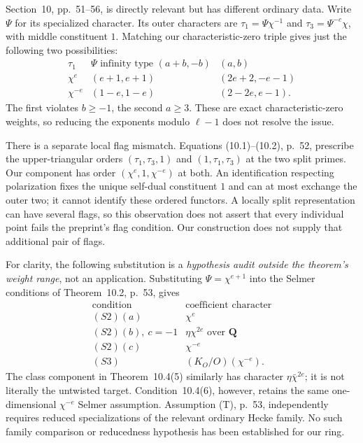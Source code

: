 Section~10, pp.~51--56, is directly relevant but has
different ordinary data.  Write $\Psi$ for its
specialized character.  Its outer characters are
$\tau_1=\Psi\chi^{-1}$ and
$\tau_3=\Psi^{-c}\chi$, with middle constituent $1$.
Matching our characteristic-zero triple gives just
the following two possibilities:
\[
 \begin{array}{c|c|c}
 \tau_1&\Psi\text{ infinity type }(a+b,-b)&(a,b)\\ \hline
 \chi^e&(e+1,e+1)&(2e+2,-e-1)\\
 \chi^{-e}&(1-e,1-e)&(2-2e,e-1).
 \end{array}                                                \tag{RC.4}
\]
The first violates $b\geq-1$, the second $a\geq3$.
These are exact characteristic-zero weights, so reducing
the exponents modulo $\ell-1$ does not resolve the issue.

There is a separate local flag mismatch.  Equations
(10.1)--(10.2), p.~52, prescribe the upper-triangular
orders $(\tau_1,\tau_3,1)$ and $(1,\tau_1,\tau_3)$ at
the two split primes.  Our component has order
$(\chi^e,1,\chi^{-e})$ at both.  An identification
respecting polarization fixes the unique self-dual
constituent $1$ and can at most exchange the outer two;
it cannot identify these ordered functors.  A locally
split representation can have several flags, so this
observation does not assert that every individual point
fails the preprint's flag condition.  Our construction
does not supply that additional pair of flags.

For clarity, the following substitution is a
\emph{hypothesis audit outside the theorem's weight
range}, not an application.  Substituting
$\Psi=\chi^{e+1}$ into the Selmer conditions of
Theorem~10.2, p.~53, gives
\[
 \begin{array}{c|c}
 \text{condition}&\text{coefficient character}\\ \hline
 (S2)(a)&\chi^e\\
 (S2)(b),\ c=-1&\eta\chi^{2e}\text{ over }\mathbf Q\\
 (S2)(c)&\chi^{-e}\\
 (S3)&(K_O/O)(\chi^{-e}).
 \end{array}                                                \tag{RC.5}
\]
The class component in Theorem~10.4(5) similarly has
character $\eta\bar\chi^{2e}$; it is not literally the
untwisted target.  Condition~10.4(6), however, retains
the same one-dimensional $\chi^{-e}$ Selmer assumption.
Assumption (T), p.~53, independently requires reduced
specializations of the relevant ordinary Hecke family.
No such family comparison or reducedness hypothesis has
been established for our ring.

